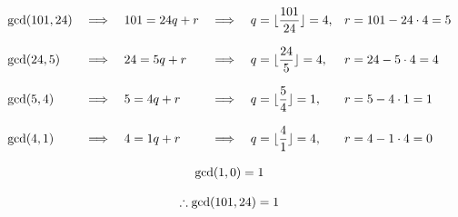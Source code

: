 \documentclass[a4paper, 11pt]{report}
\begin{document}
\newpage
{}
\sol
\begin{gather*}
  \begin{array}{lclcll}
    \gcd(101,24)  & \implies & 101 = 24q + r  & \implies & q = \floor{\dfrac{101}{24}} = 4, & r = 101 - 24\cd4 = 5 \\ \\
    \gcd(24, 5)   & \implies & 24 = 5q + r    & \implies & q = \floor{\dfrac{24}{5}} = 4,   & r = 24 - 5\cd4 = 4 \\ \\
    \gcd(5, 4)    & \implies & 5 = 4q + r     & \implies & q = \floor{\dfrac{5}{4}} = 1,    & r = 5 - 4\cd1 = 1 \\ \\
    \gcd(4, 1)    & \implies & 4 = 1q + r     & \implies & q = \floor{\dfrac{4}{1}} = 4,    & r = 4 - 1\cd4 = 0 \\ \\
    \multicolumn{6}{c}{\gcd(1, 0) = 1} \\ \\
    \multicolumn{6}{c}{\tf \gcd(101,24) = 1}
  \end{array}
\end{gather*}
\end{document}
